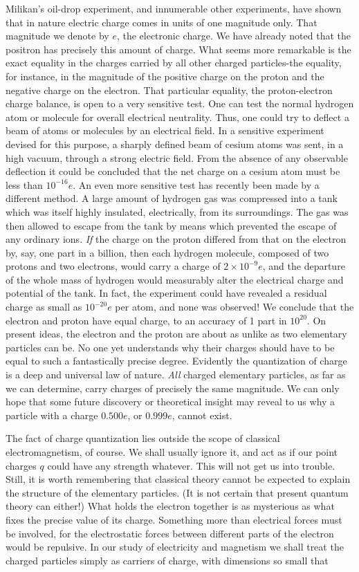 Milikan's oil-drop experiment, and innumerable other
experiments, have shown that in nature electric charge comes in units of one
magnitude only. That magnitude we denote by $e$, the electronic charge. We have
already noted that the positron has precisely this amount of charge. What seems
more remarkable is the exact equality in the charges carried by all other
charged particles-the equality, for instance, in the magnitude of the positive
charge on the proton and the negative charge on the electron. 
That particular equality, the proton-electron charge
balance, is open to a very sensitive test. One can test the normal hydrogen
atom or molecule for overall electrical neutrality. Thus, one could try to
deflect a beam of atoms or molecules by an electrical field. In a sensitive
experiment devised for this purpose, a sharply defined beam of cesium atoms was
sent, in a high vacuum, through a strong electric field. From the absence of
any observable deflection it could be concluded that the net charge on a cesium
atom must be less than $10^{-16}e$. An even more sensitive test has recently
been made by a different method. A large amount of hydrogen gas was compressed
into a tank which was itself highly insulated, electrically, from its
surroundings. The gas was then allowed to escape from the tank by means which
prevented the escape of any ordinary ions. \emph{If} the charge on the proton
differed from that on the electron by, say, one part in a billion, then each
hydrogen molecule, composed of two protons and two electrons, would carry a
charge of $2\times 10^{-9}e$, and the departure of the whole mass of hydrogen would
measurably alter the electrical charge and potential of the tank. In fact, the
experiment could have revealed a residual charge as small as $10^{-20}e$ per
atom, and none was observed! We conclude that the electron and proton have
equal charge, to an accuracy of 1 part in $10^{20}$. 
On present ideas, the electron and the proton are about as
unlike as two elementary particles can be. No one yet understands why their
charges should have to be equal to such a fantastically precise degree.
Evidently the quantization of charge is a deep and universal law of nature.
\emph{All} charged elementary particles, as far as we can determine, carry
charges of precisely the same magnitude. We can only hope that some future
discovery or theoretical insight may reveal to us why a particle with a charge
$0.500e$, or $0.999e$, cannot exist.

The fact of charge quantization lies outside the scope of
classical electromagnetism, of course. We shall usually ignore it, and act as
if our point charges $q$ could have any strength whatever. This will not get us
into trouble. Still, it is worth remembering that classical theory cannot be
expected to explain the structure of the elementary particles. (It is not
certain that present quantum theory can either!) What holds the electron
together is as mysterious as what fixes the precise value of its charge.
Something more than electrical forces must be involved, for the electrostatic
forces between different parts of the electron would be repulsive. 
In our study of electricity and magnetism we shall treat the
charged particles simply as carriers of charge, with dimensions so small
that
